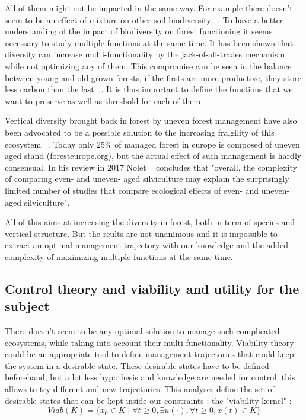 \documentclass{article}
\begin{document}
All of them might not be impacted in the same way. For example there doesn't seem to be an effect of mixture on other soil biodiversity ~\autocite{korboulewskyHowTreeDiversity2016}.
To have a better understanding of the impact of biodiversity on forest functioning it seems necessary to study multiple functions at the same time. It has been shown that diversity can increase multi-functionality by the jack-of-all-trades mechanism ~\autocite{vanderplasJackofalltradesEffectsDrive2016} while not optimizing any of them. This compromise can be seen in the balance between young and old grown forests, if the firsts are more productive, they store less carbon than the last ~\autocite{caspersenSuccessionalDiversityForest2001}. It is thus important to define the functions that we want to preserve as well as threshold for each of them.

Vertical diversity brought back in forest by uneven forest management have also been advocated to be a possible solution to the increasing fralgility of this ecosystem ~\autocite{guldinRoleUnevenAgedSilviculture1996}. Today only 25\% of managed forest in europe is composed of uneven aged stand (foresteurope.org), but the actual effect of such management is hardly consensual. In his review in 2017 Nolet ~\autocite{noletComparingEffectsEven2018} concludes that "overall, the complexity	of comparing even- and uneven- aged silviculture may explain the surprisingly limited number of studies that compare ecological effects of even- and uneven- aged silviculture".

All of this aims at increasing the diversity in forest, both in term of species and vertical structure. But the reults are not unanimous and it is impossible to extract an optimal management trajectory with our knowledge and the added complexity of maximizing multiple functions at the same time.

\subsection{Control theory and viability and utility for the subject}

There doesn't seem to be any optimal solution to manage such complicated ecosystems, while taking into account their multi-functionality. Viability theory could be an appropriate tool to define management trajectories that could keep the system in a desirable state. These desirable states have to be defined beforehand, but a lot less hypothesis and knowledge are needed for control, this allows to try different and new trajectories. This analyses define the set of desirable states that can be kept inside our constraints : the "viability kernel" \autocite{rougeExtendingViabilityTheory2013} :
\begin{equation}
    Viab(K) = \{x_0 \in K \mid \forall t \geq 0, \exists u(\cdot), \forall t \geq 0, x(t) \in K\}
\end{equation}
\end{document}
